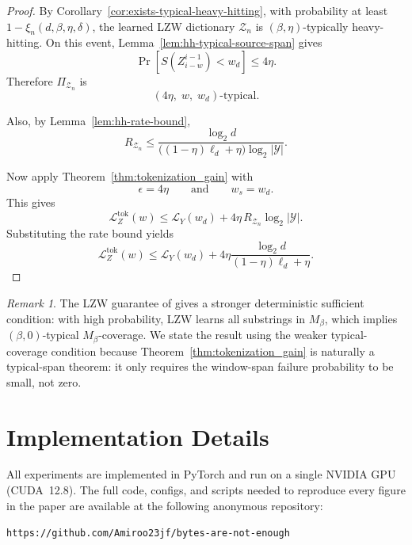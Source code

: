 \documentclass{article}
\theoremstyle{plain}
\theoremstyle{definition}
\theoremstyle{remark}
\newtheorem{remark}{Remark}[section]
\begin{document}
    \begin{proof}
    By Corollary~\ref{cor:exists-typical-heavy-hitting}, with probability at least
    $1-\xi_n(d,\beta,\eta,\delta)$, the learned LZW dictionary $\mathcal Z_n$ is
    $(\beta,\eta)$-typically heavy-hitting. On this event,
    Lemma~\ref{lem:hh-typical-source-span} gives
    \[
        \Pr\!\left[
            S(Z_{i-w}^{i-1}) < w_d
        \right]
        \le
        4\eta.
    \]
    Therefore $\Pi_{\mathcal Z_n}$ is
    \[
        \left(4\eta,\; w,\; w_d\right)\text{-typical}.
    \]
    
    Also, by Lemma~\ref{lem:hh-rate-bound},
    \[
        R_{\mathcal Z_n}
        \le
        \frac{\log_2 d}
             {\big((1-\eta)\ell_d+\eta\big)\log_2|\mathcal Y|}.
    \]
    
    Now apply Theorem~\ref{thm:tokenization_gain} with
    \[
        \epsilon=4\eta
        \qquad\text{and}\qquad
        w_s=w_d.
    \]
    This gives
    \[
        \mathcal L_Z^{\mathrm{tok}}(w)
        \le
        \mathcal L_Y(w_d)
        +
        4\eta\,R_{\mathcal Z_n}\log_2|\mathcal Y|.
    \]
    Substituting the rate bound yields
    \[
        \mathcal L_Z^{\mathrm{tok}}(w)
        \le
        \mathcal L_Y(w_d)
        +
        4\eta
        \frac{\log_2 d}
             {(1-\eta)\ell_d+\eta}.
    \]
    \end{proof}
    
    \begin{remark}
    The LZW guarantee of \citet{rajaramanAnalysisTokenizationTransformers2024}
    gives a stronger deterministic sufficient condition: with high probability,
    LZW learns all substrings in $M_\beta$, which implies $(\beta,0)$-typical
    $M_\beta$-coverage. We state the result using the weaker typical-coverage
    condition because Theorem~\ref{thm:tokenization_gain} is naturally a
    typical-span theorem: it only requires the window-span failure probability to be
    small, not zero.
    \end{remark}


    \newpage

    \section{Implementation Details}
\label{sec:implementation}

All experiments are implemented in PyTorch and run
on a single NVIDIA GPU (CUDA~12.8).
The full code, configs, and scripts needed to reproduce every figure in the
paper are available at the following anonymous repository:
\begin{center}
  \texttt{https://github.com/Amiroo23jf/bytes-are-not-enough}
\end{center}
\end{document}
